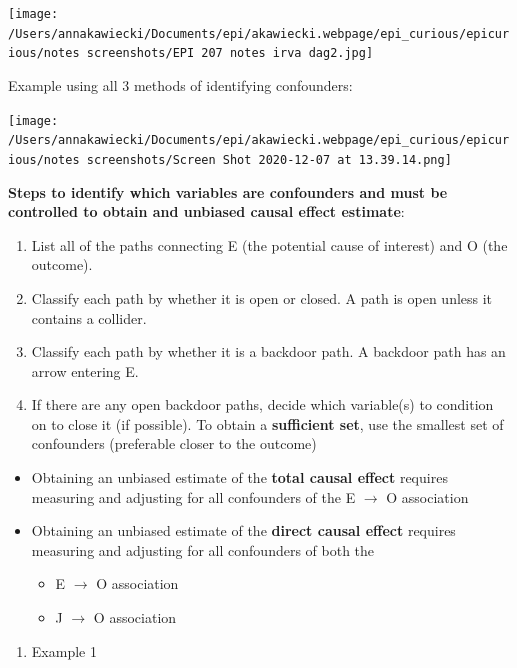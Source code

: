 \documentclass[
]{article}
\providecommand{\tightlist}{%
  \setlength{\itemsep}{0pt}\setlength{\parskip}{0pt}}
\begin{document}
\texttt{[image: /Users/annakawiecki/Documents/epi/akawiecki.webpage/epi\_curious/epicurious/notes screenshots/EPI 207 notes irva dag2.jpg]}

Example using all 3 methods of identifying confounders:

\texttt{[image: /Users/annakawiecki/Documents/epi/akawiecki.webpage/epi\_curious/epicurious/notes screenshots/Screen Shot 2020-12-07 at 13.39.14.png]}

\textbf{Steps to identify which variables are confounders and must be
controlled to obtain and unbiased causal effect estimate}:

\begin{enumerate}
\def\labelenumi{\arabic{enumi}.}
\item
  List all of the paths connecting E (the potential cause of interest)
  and O (the outcome).
\item
  Classify each path by whether it is open or closed. A path is open
  unless it contains a collider.
\item
  Classify each path by whether it is a backdoor path. A backdoor path
  has an arrow entering E.
\item
  If there are any open backdoor paths, decide which variable(s) to
  condition on to close it (if possible). To obtain a \textbf{sufficient
  set}, use the smallest set of confounders (preferable closer to the
  outcome)
\end{enumerate}

\begin{itemize}
\item
  Obtaining an unbiased estimate of the \textbf{total causal effect}
  requires measuring and adjusting for all confounders of the E \(\to\)
  O association
\item
  Obtaining an unbiased estimate of the \textbf{direct causal effect}
  requires measuring and adjusting for all confounders of both the

  \begin{itemize}
  \item
    E \(\to\) O association
  \item
    J \(\to\) O association
  \end{itemize}
\end{itemize}

\begin{enumerate}
\def\labelenumi{\arabic{enumi}.}
\tightlist
\item
  Example 1
\end{enumerate}
\end{document}
